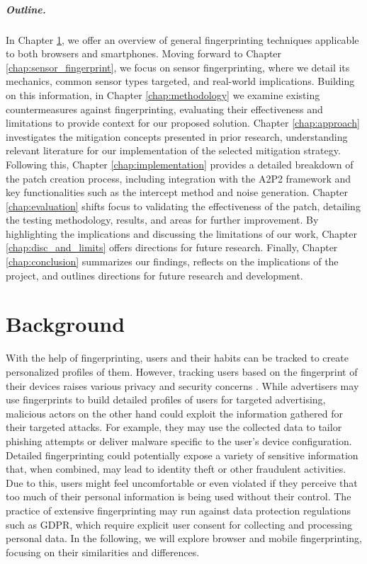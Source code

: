 \documentclass[11pt,
  oneside,openany,    %
]{scrreprt}
\begin{document}
\paragraph{Outline.}
In Chapter \ref{chap:background}, we offer an overview of general fingerprinting techniques applicable to both browsers and smartphones. 
Moving forward to Chapter \ref{chap:sensor_fingerprint}, we focus on sensor fingerprinting, where we detail its mechanics, common sensor types targeted, and real-world implications.
Building on this information, in Chapter \ref{chap:methodology} we examine existing countermeasures against fingerprinting, evaluating their effectiveness and limitations to provide context for our proposed solution. 
Chapter \ref{chap:approach} investigates the mitigation concepts presented in prior research, understanding relevant literature for our implementation of the selected mitigation strategy.
Following this, Chapter \ref{chap:implementation} provides a detailed breakdown of the patch creation process, including integration with the A2P2 framework and key functionalities such as the intercept method and noise generation. 
Chapter \ref{chap:evaluation} shifts focus to validating the effectiveness of the patch, detailing the testing methodology, results, and areas for further improvement. 
By highlighting the implications and discussing the limitations of our work, Chapter \ref{chap:disc_and_limits} offers directions for future research.
Finally, Chapter \ref{chap:conclusion} summarizes our findings, reflects on the implications of the project, and outlines directions for future research and development.


\chapter{Background}
\label{chap:background}
With the help of fingerprinting, users and their habits can be tracked to create personalized profiles of them.
However, tracking users based on the fingerprint of their devices raises various privacy and security concerns \cite{DBLP:conf/ndss/MengZXZZBLTD23}.
While advertisers may use fingerprints to build detailed profiles of users for targeted advertising, malicious actors on the other hand could exploit the information gathered for their targeted attacks. 
For example, they may use the collected data to tailor phishing attempts or deliver malware specific to the user's device configuration.
Detailed fingerprinting could potentially expose a variety of sensitive information that, when combined, may lead to identity theft or other fraudulent activities.
Due to this, users might feel uncomfortable or even violated if they perceive that too much of their personal information is being used without their control.
The practice of extensive fingerprinting may run against data protection regulations such as GDPR, which require explicit user consent for collecting and processing personal data.
In the following, we will explore browser and mobile fingerprinting, focusing on their similarities and differences.
\end{document}
